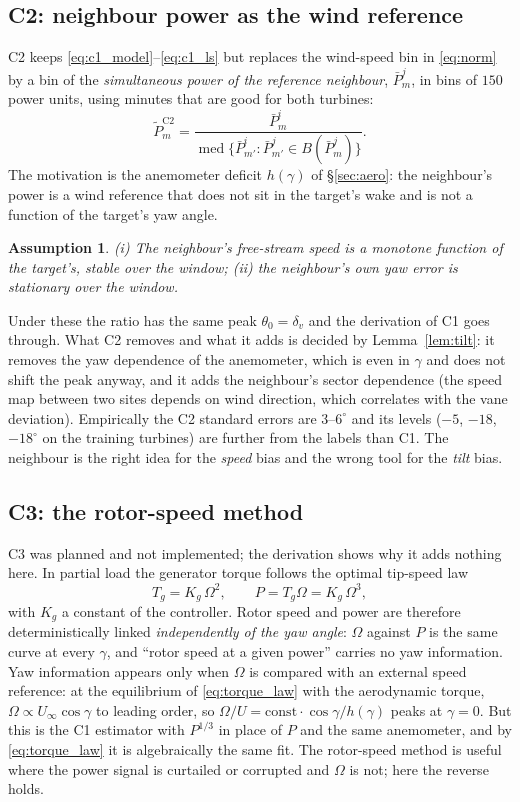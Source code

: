 \documentclass[11pt,a4paper]{article}
\newtheorem{assumption}{Assumption}
\theoremstyle{remark}
\newcommand{\med}{\operatorname{med}}
\newcommand{\dg}{^{\circ}}
\begin{document}
\subsection{C2: neighbour power as the wind reference}\label{sec:c2}
C2 keeps \eqref{eq:c1_model}--\eqref{eq:c1_ls} but replaces the wind-speed bin in
\eqref{eq:norm} by a bin of the \emph{simultaneous power of the reference
neighbour}, $\bar P^j_m$, in bins of $150$ power units, using minutes that are
good for both turbines:
\begin{equation}
  \tilde P_m^{\mathrm{C2}} = \frac{\bar P^i_m}{\med\{\bar P^i_{m'} : \bar P^j_{m'} \in B(\bar P^j_m)\}} .
\end{equation}
The motivation is the anemometer deficit $h(\gamma)$ of \S\ref{sec:aero}: the
neighbour's power is a wind reference that does not sit in the target's wake
and is not a function of the target's yaw angle.
\begin{assumption}
(i) The neighbour's free-stream speed is a monotone function of the target's,
stable over the window; (ii) the neighbour's own yaw error is stationary over
the window.
\end{assumption}
\noindent Under these the ratio has the same peak $\theta_0=\delta_v$ and the
derivation of C1 goes through. What C2 removes and what it adds is decided by
Lemma~\ref{lem:tilt}: it removes the yaw dependence of the anemometer, which is
even in $\gamma$ and does not shift the peak anyway, and it adds the neighbour's
sector dependence (the speed map between two sites depends on wind direction,
which correlates with the vane deviation). Empirically the C2 standard errors
are $3$--$6\dg$ and its levels ($-5$, $-18$, $-18\dg$ on the training turbines)
are further from the labels than C1. The neighbour is the right idea for the
\emph{speed} bias and the wrong tool for the \emph{tilt} bias.

\subsection{C3: the rotor-speed method}\label{sec:c3}
C3 was planned and not implemented; the derivation shows why it adds nothing
here. In partial load the generator torque follows the optimal tip-speed law
\begin{equation}
  T_g = K_g\,\Omega^2,\qquad P = T_g\Omega = K_g\,\Omega^3 ,
  \label{eq:torque_law}
\end{equation}
with $K_g$ a constant of the controller. Rotor speed and power are therefore
deterministically linked \emph{independently of the yaw angle}: $\Omega$ against
$P$ is the same curve at every $\gamma$, and ``rotor speed at a given power''
carries no yaw information. Yaw information appears only when $\Omega$ is
compared with an external speed reference: at the equilibrium of
\eqref{eq:torque_law} with the aerodynamic torque, $\Omega\propto U_\infty\cos\gamma$
to leading order, so $\Omega/U = \text{const}\cdot\cos\gamma/h(\gamma)$ peaks at
$\gamma=0$. But this is the C1 estimator with $P^{1/3}$ in place of $P$ and the
same anemometer, and by \eqref{eq:torque_law} it is algebraically the same fit.
The rotor-speed method is useful where the power signal is curtailed or
corrupted and $\Omega$ is not; here the reverse holds.
\end{document}
